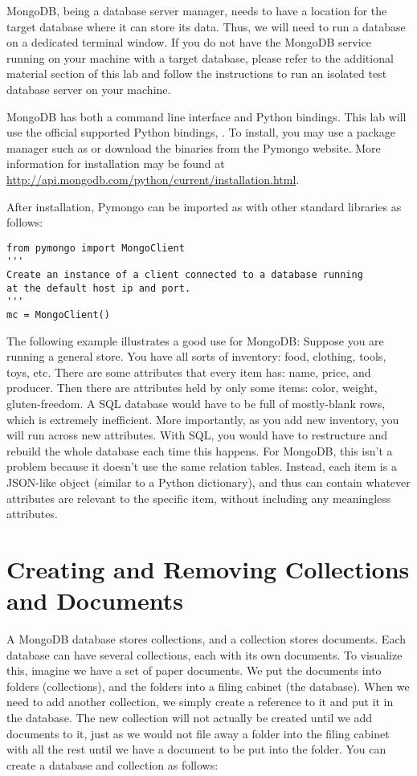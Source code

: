 MongoDB, being a database server manager, needs to have a location for the target database where it can store its data.
Thus, we will need to run a database on a dedicated terminal window.
If you do not have the MongoDB service running on your machine with a target database, please refer to the additional material section of this lab and follow the instructions to run an isolated test database server on your machine.

MongoDB has both a command line interface and Python bindings. 
This lab will use the official supported Python bindings, .
To install, you may use a package manager such as  or download the binaries from the Pymongo website.
More information for installation may be found at \url{http://api.mongodb.com/python/current/installation.html}.

After installation, Pymongo can be imported as with other standard libraries as follows: 
 
\begin{lstlisting}
from pymongo import MongoClient
'''
Create an instance of a client connected to a database running
at the default host ip and port.
'''
mc = MongoClient()
\end{lstlisting}

The following example illustrates a good use for MongoDB: Suppose you are running a general store.
You have all sorts of inventory: food, clothing, tools, toys, etc.
There are some attributes that every item has: name, price, and producer.
Then there are attributes held by only some items: color, weight, gluten-freedom.
A SQL database would have to be full of mostly-blank rows, which is extremely inefficient.
More importantly, as you add new inventory, you will run across new attributes.
With SQL, you would have to restructure and rebuild the whole database each time this happens.
For MongoDB, this isn't a problem because it doesn't use the same relation tables.
Instead, each item is a JSON-like object (similar to a Python dictionary), and thus can contain whatever attributes are relevant to the specific item, without including any meaningless attributes.


\section*{Creating and Removing Collections and Documents}
A MongoDB database stores collections, and a collection stores documents.
Each database can have several collections, each with its own documents.
To visualize this, imagine we have a set of paper documents.
We put the documents into folders (collections), and the folders into a filing cabinet (the database).
When we need to add another collection, we simply create a reference to it and put it in the database.
The new collection will not actually be created until we add documents to it, just as we would not file away a folder into the filing cabinet with all the rest until we have a document to be put into the folder.
You can create a database and collection as follows:

